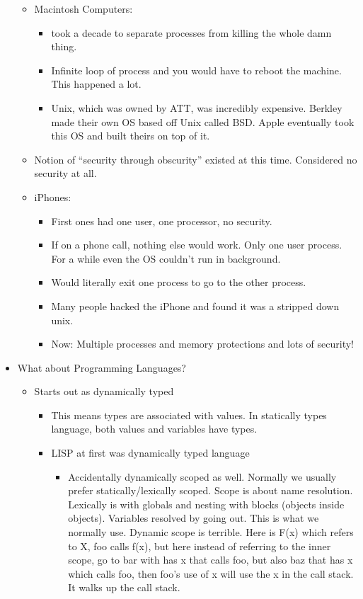 \documentclass[twoside]{article}
\begin{document}
\begin{itemize}
\begin{itemize}
\begin{itemize}
\end{itemize}
\item Macintosh Computers:
\begin{itemize}
\item took a decade to separate processes from killing the whole damn thing.
\item Infinite loop of process and you would have to reboot the machine. This happened a lot.
\item Unix, which was owned by ATT, was incredibly expensive. Berkley made their own OS based off Unix called BSD. Apple eventually took this OS and built theirs on top of it.
\end{itemize}
\item Notion of “security through obscurity” existed at this time. Considered no security at all. 
\item iPhones: 
\begin{itemize}
\item First ones had one user, one processor, no security.
\item If on a phone call, nothing else would work. Only one user process. For a while even the OS couldn’t run in background.
\item Would literally exit one process to go to the other process.
\item Many people hacked the iPhone and found it was a stripped down unix. 
\item Now: Multiple processes and memory protections and lots of security!
\end{itemize}
\end{itemize}
\item What about Programming Languages?
\begin{itemize}
\item Starts out as dynamically typed
\begin{itemize}
\item This means types are associated with values. In statically types language, both values and variables have types.
\item LISP at first was dynamically typed language
\begin{itemize}
\item Accidentally dynamically scoped as well. Normally we usually prefer statically/lexically scoped. Scope is about name resolution. Lexically is with globals and nesting with blocks (objects inside objects). Variables resolved by going out. This is what we normally use.
Dynamic scope is terrible. Here is F(x) which refers to X, foo calls f(x), but here instead of referring to the inner scope, go to bar with has x that calls foo, but also baz that has x which calls foo, then foo’s use of x will use the x in the call stack. It walks up the call stack.

\end{itemize}
\end{itemize}
\end{itemize}
\end{itemize}
\end{document}
